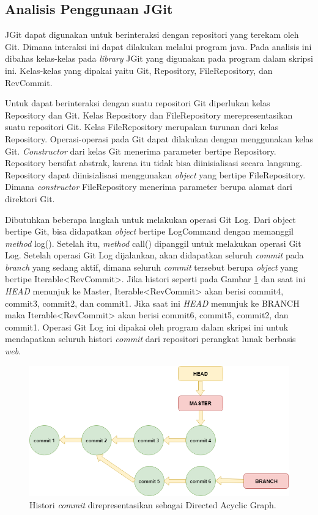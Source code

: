 \subsection{Analisis Penggunaan JGit}
\label{subsec:analisis_jgit}
JGit dapat digunakan untuk berinteraksi dengan repositori yang terekam oleh Git. Dimana interaksi ini dapat dilakukan melalui program java. Pada analisis ini dibahas kelas-kelas pada \textit{library} JGit yang digunakan pada program dalam skripsi ini. Kelas-kelas yang dipakai yaitu Git, Repository, FileRepository, dan RevCommit.

Untuk dapat berinteraksi dengan suatu repositori Git diperlukan kelas Repository dan Git. Kelas Repository dan FileRepository merepresentasikan suatu repositori Git. Kelas FileRepository merupakan turunan dari kelas Repository. Operasi-operasi pada Git dapat dilakukan dengan menggunakan kelas Git. \textit{Constructor} dari kelas Git menerima parameter bertipe Repository. Repository bersifat abstrak, karena itu tidak bisa diinisialisasi secara langsung. Repository dapat diinisialisasi menggunakan \textit{object} yang bertipe FileRepository. Dimana \textit{constructor} FileRepository menerima parameter berupa alamat dari direktori Git. 

Dibutuhkan beberapa langkah untuk melakukan operasi Git Log. Dari object bertipe Git, bisa didapatkan \textit{object} bertipe LogCommand dengan memanggil \textit{method} log(). Setelah itu, \textit{method} call() dipanggil untuk melakukan operasi Git Log. Setelah operasi Git Log dijalankan, akan didapatkan seluruh \textit{commit} pada \textit{branch} yang sedang aktif, dimana seluruh \textit{commit} tersebut berupa \textit{object} yang bertipe Iterable<RevCommit>. Jika histori seperti pada Gambar \ref{fig:DAG} dan saat ini \textit{HEAD} menunjuk ke Master, Iterable<RevCommit> akan berisi commit4, commit3, commit2, dan commit1. Jika saat ini \textit{HEAD} menunjuk ke BRANCH maka Iterable<RevCommit> akan berisi commit6, commit5, commit2, dan commit1. Operasi Git Log ini dipakai oleh program dalam skripsi ini untuk mendapatkan seluruh histori \textit{commit} dari repositori perangkat lunak berbasis \textit{web}.

\begin{figure}[H]
	\centering
		\includegraphics[scale=0.6]{Gambar/DAG.png}
	\caption{Histori \textit{commit} direpresentasikan sebagai Directed Acyclic Graph.}
	\label{fig:DAG}
\end{figure}

